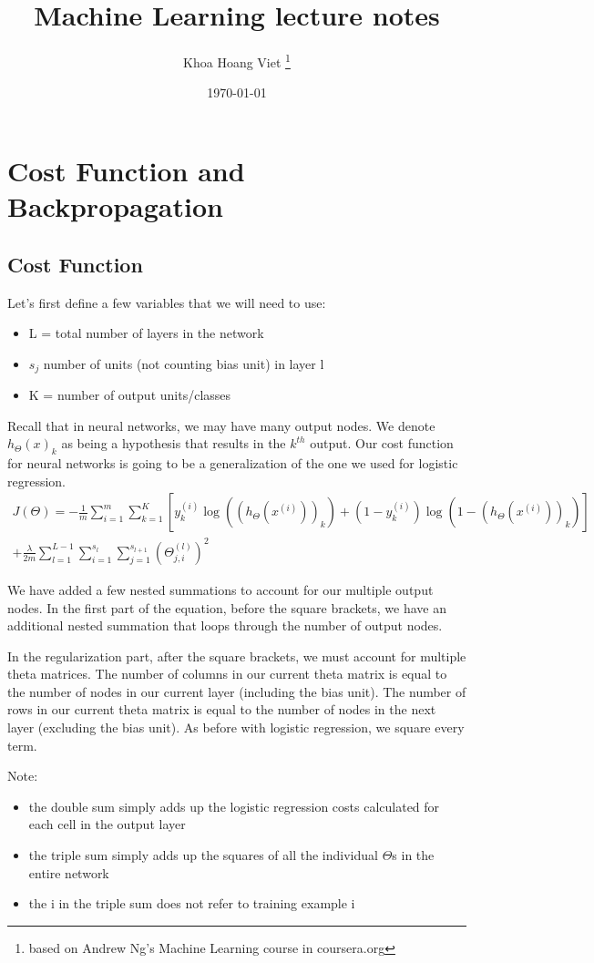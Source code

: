 \documentclass{report}
\title{Machine Learning lecture notes}
\author{Khoa Hoang Viet \thanks{based on Andrew Ng's Machine Learning course in coursera.org}}
\date{\today}
\begin{document}
\section{Cost Function and Backpropagation}
\subsection{Cost Function}
Let's first define a few variables that we will need to use:
\begin{itemize}
  	\item L = total number of layers in the network
  	\item $s_j$ number of units (not counting bias unit) in layer l
  	\item K = number of output units/classes
\end{itemize}

Recall that in neural networks, we may have many output nodes. We denote $h_\Theta(x)_k$  as being a hypothesis that results in the $k^{th}$ output. Our cost function for neural networks is going to be a generalization of the one we used for logistic regression. 
\begin{gather*} 
	J(\Theta) = - \frac{1}{m} \sum_{i=1}^m \sum_{k=1}^K \left[y^{(i)}_k \log ((h_\Theta (x^{(i)}))_k) + (1 - y^{(i)}_k)\log (1 - (h_\Theta(x^{(i)}))_k)\right] \\ 
	+ \frac{\lambda}{2m}\sum_{l=1}^{L-1} \sum_{i=1}^{s_l} \sum_{j=1}^{s_{l+1}} ( \Theta_{j,i}^{(l)})^2
\end{gather*}

We have added a few nested summations to account for our multiple output nodes. In the first part of the equation, before the square brackets, we have an additional nested summation that loops through the number of output nodes.

In the regularization part, after the square brackets, we must account for multiple theta matrices. The number of columns in our current theta matrix is equal to the number of nodes in our current layer (including the bias unit). The number of rows in our current theta matrix is equal to the number of nodes in the next layer (excluding the bias unit). As before with logistic regression, we square every term.

Note:
\begin{itemize}
	\item the double sum simply adds up the logistic regression costs calculated for each cell in the output layer
	\item the triple sum simply adds up the squares of all the individual $\Theta$s in the entire network
	\item the i in the triple sum does not refer to training example i
\end{itemize}
\end{document}
